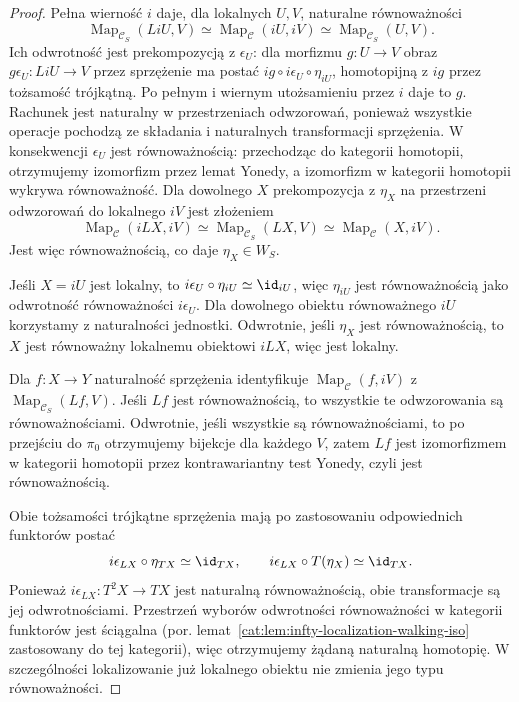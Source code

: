 \begin{proof}
Pełna wierność $i$ daje, dla lokalnych $U,V$, naturalne równoważności
\[
 \operatorname{Map}_{\mathcal C_S}(LiU,V)
 \simeq \operatorname{Map}_{\mathcal C}(iU,iV)
 \simeq \operatorname{Map}_{\mathcal C_S}(U,V).
\]
Ich odwrotność jest prekompozycją z $\epsilon_U$: dla morfizmu $g:U\to V$ obraz $g\epsilon_U:LiU\to V$ przez sprzężenie ma postać $ig\circ i\epsilon_U\circ\eta_{iU}$, homotopijną z $ig$ przez tożsamość trójkątną. Po pełnym i wiernym utożsamieniu przez $i$ daje to $g$. Rachunek jest naturalny w przestrzeniach odwzorowań, ponieważ wszystkie operacje pochodzą ze składania i naturalnych transformacji sprzężenia. W konsekwencji $\epsilon_U$ jest równoważnością: przechodząc do kategorii homotopii, otrzymujemy izomorfizm przez lemat Yonedy, a izomorfizm w kategorii homotopii wykrywa równoważność. Dla dowolnego $X$ prekompozycja z $\eta_X$ na przestrzeni odwzorowań do lokalnego $iV$ jest złożeniem
\[
 \operatorname{Map}_{\mathcal C}(iLX,iV)
 \simeq\operatorname{Map}_{\mathcal C_S}(LX,V)
 \simeq\operatorname{Map}_{\mathcal C}(X,iV).
\]
Jest więc równoważnością, co daje $\eta_X\in W_S$.

Jeśli $X=iU$ jest lokalny, to $i\epsilon_U\circ\eta_{iU}\simeq\id_{iU}$, więc $\eta_{iU}$ jest równoważnością jako odwrotność równoważności $i\epsilon_U$. Dla dowolnego obiektu równoważnego $iU$ korzystamy z naturalności jednostki. Odwrotnie, jeśli $\eta_X$ jest równoważnością, to $X$ jest równoważny lokalnemu obiektowi $iLX$, więc jest lokalny.

Dla $f:X\to Y$ naturalność sprzężenia identyfikuje $\operatorname{Map}_{\mathcal C}(f,iV)$ z $\operatorname{Map}_{\mathcal C_S}(Lf,V)$. Jeśli $Lf$ jest równoważnością, to wszystkie te odwzorowania są równoważnościami. Odwrotnie, jeśli wszystkie są równoważnościami, to po przejściu do $\pi_0$ otrzymujemy bijekcje dla każdego $V$, zatem $Lf$ jest izomorfizmem w kategorii homotopii przez kontrawariantny test Yonedy, czyli jest równoważnością.

Obie tożsamości trójkątne sprzężenia mają po zastosowaniu odpowiednich funktorów postać
\[
 i\epsilon_{LX}\circ \eta_{TX}\simeq \id_{TX},
 \qquad
 i\epsilon_{LX}\circ T(\eta_X)\simeq \id_{TX}.
\]
Ponieważ $i\epsilon_{LX}:T^2X\to TX$ jest naturalną równoważnością, obie transformacje są jej odwrotnościami. Przestrzeń wyborów odwrotności równoważności w kategorii funktorów jest ściągalna (por. lemat~\ref{cat:lem:infty-localization-walking-iso} zastosowany do tej kategorii), więc otrzymujemy żądaną naturalną homotopię. W szczególności lokalizowanie już lokalnego obiektu nie zmienia jego typu równoważności.
\end{proof}

